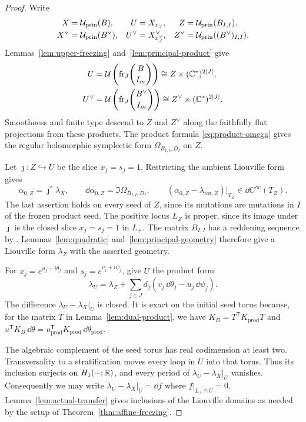 \documentclass[12pt, letter]{amsart}
\theoremstyle{definition}
\newcommand{\pr}{\mathrm{prin}}
\newcommand{\fr}{\mathrm{fr}}
\numberwithin{equation}{section}
\begin{document}
\begin{proof}
Write
\[
 \begin{aligned}
 X&=\cU_{\pr}(B),&
 U&=X_{x_J},& Z&=\cU_{\pr}(B_{I,I}),\\
 X^\vee&=\cU_{\pr}(B^\vee),&
 U^\vee&=X^\vee_{x_J^\vee},&
 Z^\vee&=\cU_{\pr}((B^\vee)_{I,I}).
 \end{aligned}
\]
Lemmas~\ref{lem:upper-freezing} and~\ref{lem:principal-product} give
\[
 \begin{aligned}
 U&=\cU\left(\fr_J\binom B{I_m}\right)
       \cong Z\times(\C^*)^{2|J|},\\
 U^\vee&=\cU\left(\fr_J\binom{B^\vee}{I_m}\right)
       \cong Z^\vee\times(\C^*)^{2|J|}.
 \end{aligned}
\]
Smoothness and finite type descend to $Z$ and $Z^\vee$ along
the faithfully flat projections from these products.
The product formula \eqref{eq:product-omega} gives the regular
holomorphic symplectic form $\Omega_{B_{I,I},D_I}$ on $Z$.

Let $\jmath:Z\hookrightarrow U$ be the slice $x_j=s_j=1$.
Restricting the ambient Liouville form gives
\[
 \alpha_{0,Z}=\jmath^*\lambda_X,\qquad
 \dd\alpha_{0,Z}=\Im\Omega_{B_{I,I},D_I},\qquad
 (\alpha_{0,Z}-\lambda_{\mathrm{tor},Z})|_{T_Z}
       \in\dd C^\infty(T_Z).
\]
The last assertion holds on every seed of $Z$, since its mutations
are mutations in $I$ of the frozen product seed.
The positive locus $L_Z$ is proper, since its image under $\jmath$
is the closed slice $x_j=s_j=1$ in $L_+$.
The matrix $B_{I,I}$ has a reddening sequence by
\cite[Lemma~4.9]{CL}.
Lemmas~\ref{lem:quadratic} and~\ref{lem:principal-geometry}
therefore give a Liouville form $\lambda_Z$ with the asserted geometry.

For $x_j=e^{u_j+i\theta_j}$ and $s_j=e^{v_j+i\psi_j}$, give $U$
the product form
\[
 \lambda_U=\lambda_Z+
       \sum_{j\in J}d_j(v_j\,\dd\theta_j-u_j\,\dd\psi_j).
\]
The difference $\lambda_U-\lambda_X|_U$ is closed.
It is exact on the initial seed torus because, for the matrix
$T$ in Lemma~\ref{lem:dual-product}, we have $
 K_B=T^{\mathsf T}K_{\mathrm{prod}}T$ and $
 u^{\mathsf T}K_B\,\dd\theta
 =u_{\mathrm{prod}}^{\mathsf T}K_{\mathrm{prod}}
       \,\dd\theta_{\mathrm{prod}}.
$

The algebraic complement of the seed torus has real codimension
at least two. Transversality to a stratification moves every loop
in $U$ into that torus. Thus its inclusion surjects on
$H_1(-;\mathbb R)$, and every period of $\lambda_U-\lambda_X|_U$ vanishes.
Consequently we may write 
$
 \lambda_U-\lambda_X|_U=\dd f$ where $ f|_{L_+\cap U}=0. 
$
Lemma~\ref{lem:actual-transfer} gives inclusions of the Liouville domains as needed by the setup of  Theorem~\ref{thm:affine-freezing}.


\end{proof}
\end{document}
